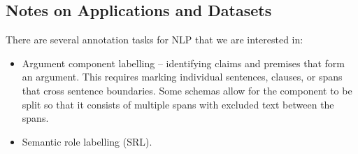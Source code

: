 \subsection{Notes on Applications and Datasets}

There are several annotation tasks for NLP that we are interested in:
\begin{itemize}
  \item Argument component labelling -- identifying claims and premises that form an argument. This requires marking individual sentences, clauses, or spans that cross sentence boundaries. Some schemas allow for the component to be split so that it consists of multiple spans with excluded text between the spans.
  \item Semantic role labelling (SRL).
\end{itemize}
